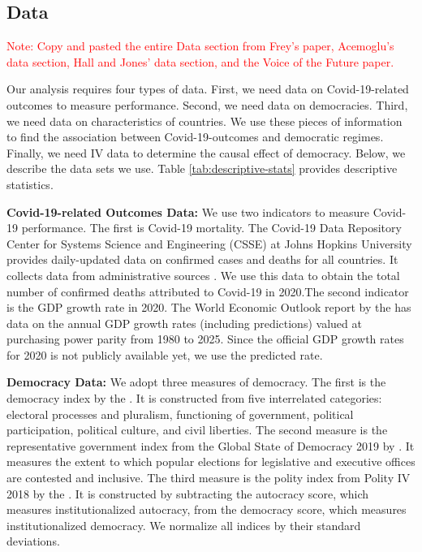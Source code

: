\subsection{Data}

\textcolor{red}{Note: Copy and pasted the entire Data section from Frey's paper, Acemoglu's data section, Hall and Jones' data section, and the Voice of the Future paper. }

Our analysis requires four types of data. First, we need data on Covid-19-related outcomes to measure performance. Second, we need data on democracies. Third, we need data on characteristics of countries. We use these pieces of information to find the association between Covid-19-outcomes and democratic regimes. Finally, we need IV data to determine the causal effect of democracy. Below, we describe the data sets we use. Table \ref{tab:descriptive-stats} provides descriptive statistics. 

\textbf{Covid-19-related Outcomes Data:} We use two indicators to measure Covid-19 performance. The first is Covid-19 mortality. The Covid-19 Data Repository Center for Systems Science and Engineering (CSSE) at Johns Hopkins University provides daily-updated data on confirmed cases and deaths for all countries. It collects data from administrative sources \citep{covid-data}. We use this data to obtain the total number of confirmed deaths attributed to Covid-19 in 2020.The second indicator is the GDP growth rate in 2020. The World Economic Outlook report by the \citet{imf} has data on the annual GDP growth rates (including predictions) valued at purchasing power parity from 1980 to 2025. Since the official GDP growth rates for 2020 is not publicly available yet, we use the predicted rate. 

\textbf{Democracy Data:} We adopt three measures of democracy. The first is the democracy index by the \citet{eiu}. It is constructed from five interrelated categories: electoral processes and pluralism, functioning of government, political participation, political culture, and civil liberties. The second measure is the representative government index from the Global State of Democracy 2019 by \citet{gsd}. It measures the extent to which popular elections for legislative and executive offices are contested and inclusive. The third measure is the polity index from Polity IV 2018 by the \citet{polity}. It is constructed by subtracting the autocracy score, which measures institutionalized autocracy, from the democracy score, which measures institutionalized democracy. We normalize all indices by their standard deviations. 

